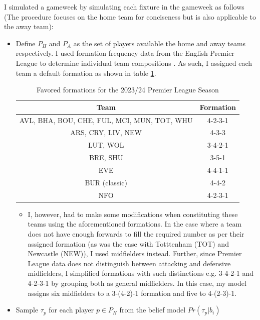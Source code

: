I simulated a gameweek by simulating each fixture in the gameweek as follows (The procedure focuses on the home team for conciseness but is also applicable to the away team):
\begin{itemize}
    \item Define $P_H$ and $P_A$ as the set of players available the home and away teams respectively. I used formation frequency data from the English Premier League to determine individual team compositions \cite{clarke2024}. As such, I assigned each team a default formation as shown in table \ref{tab:fomation_table}.
    \begin{table}[h!]
        \centering
        \begin{tabular}{|c|c|}
            \hline
            Team & Formation \\ \hline
            AVL, BHA, BOU, CHE, FUL, MCI, MUN, TOT, WHU & 4-2-3-1    \\ \hline
            ARS, CRY, LIV, NEW & 4-3-3  \\ \hline
            LUT, WOL & 3-4-2-1 \\ \hline
            BRE, SHU & 3-5-1 \\ \hline
            EVE & 4-4-1-1 \\ \hline
            BUR (classic) & 4-4-2 \\ \hline
            NFO & 4-2-3-1 \\ \hline
        \end{tabular}
        \caption{Favored formations for the 2023/24 Premier League Season}
        \label{tab:fomation_table}
    \end{table}
    \begin{itemize}
        \item I, however, had to make some modifications when constituting these teams using the aforementioned formations. In the case where a team does not have enough forwards to fill the required number as per their assigned formation (as was the case with Totttenham (TOT) and Newcastle (NEW)), I used midfielders instead. Further, since Premier League data does not distinguish between attacking and defensive midfielders, I simplified formations with such distinctions e.g. 3-4-2-1 and 4-2-3-1 by grouping both as general midfielders. In this case, my model assigns six midfielders to a 3-(4-2)-1 formation and five to 4-(2-3)-1.
    \end{itemize}
    \item Sample $\tau_p$ for each player $p \in P_H$  from the belief model $Pr(\tau_p | b_i)$

\end{itemize}

